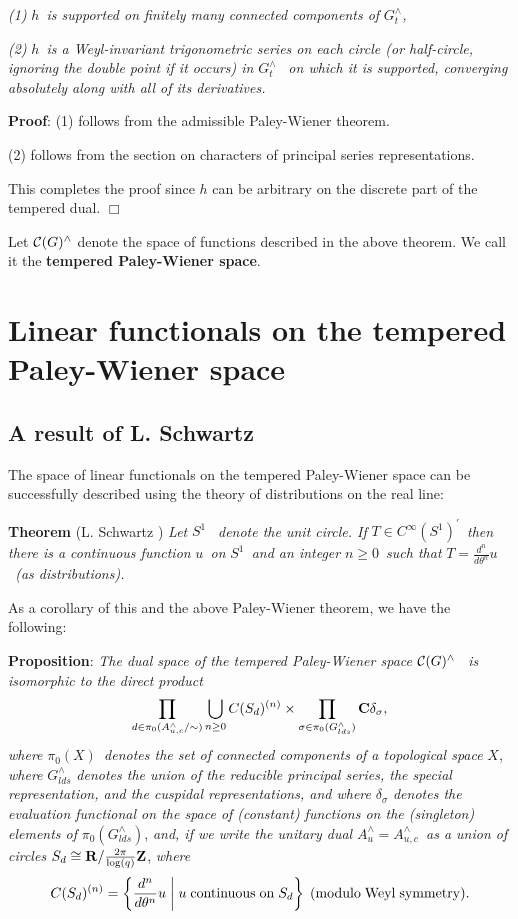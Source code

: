 \documentclass[11pt, a4paper]{article}
\begin{document}
{\em (1) }$h${\em \ is supported on finitely many connected components of }$%
G_t^{\wedge }${\em ,}

{\em (2) }$h${\em \ is a Weyl-invariant trigonometric series on each circle (or
half-circle, ignoring the double point if it occurs) in }$G_t^{\wedge }${\em %
\ on which it is supported, converging absolutely along with all of its
derivatives.}

{\bf Proof}: (1) follows from the admissible Paley-Wiener theorem.

(2) follows from the section on characters of principal series
representations.

This completes the proof since $h$ can be arbitrary on the discrete part of
the tempered dual. $\Box $

Let ${\cal C}(G)^{\wedge }$ denote the space of functions described in the
above theorem. We call it the {\bf tempered Paley-Wiener space}.

\section{Linear functionals on the tempered Paley-Wiener space}

\subsection{A result of L. Schwartz}

The space of linear functionals on the tempered Paley-Wiener space can be
successfully described using the theory of distributions on the real line:

{\bf Theorem} (L. Schwartz \cite[ch.~III, Th\'eor\`eme~XXI]{Sch}) {\em Let }$S^1$%
{\em \ denote the unit circle. If }$T\in C^\infty (S^1)^{\prime }${\em \
then there is a continuous function }$u${\em \ on }$S^1${\em \ and an
integer }$n\geq 0${\em \ such that }$T=\frac{d^n}{d\theta ^n}u${\em \ (as
distributions).}

As a corollary of this and the above Paley-Wiener theorem, we have the
following:

{\bf Proposition}: {\em The dual space of the tempered Paley-Wiener space } $%
{\cal C}(G)^{\wedge }$ {\em \ is isomorphic to the direct product}
\[
\prod_{d\in \pi _0(A_{u,c}^{\wedge }/\sim )}\bigcup_{n\geq
0}C(S_d)^{(n)}\times \prod_{\sigma \in \pi _0(G_{lds}^{\wedge })}{\bf %
C}\delta _\sigma ,
\]
{\em where }$\pi _0(X)${\em \ denotes the set of connected components of a
topological space }$X$, {\em where} $G_{lds}^{\wedge }$ {\em denotes the
union of the reducible principal series, the special representation, and the
cuspidal representations, and where }$\delta _\sigma $ {\em denotes
the evaluation functional on the space of (constant) functions on the
(singleton) elements of }$\pi _0(G_{lds}^{\wedge })$, {\em and, if we write
the unitary dual }$A_u^{\wedge }=A_{u,c}^{\wedge }${\em \ as a union of
circles }$S_d\cong {\bf R}/\frac{2\pi }{\log (q)}{\bf Z}$, {\em where}
\[
C(S_d)^{(n)}=\left\{\frac{d^n}{d\theta ^n}u\;\middle|\;u\;{\rm continuous\;on\;}S_d\right\}\;({\rm modulo\;Weyl\;symmetry}).
\]
\end{document}
